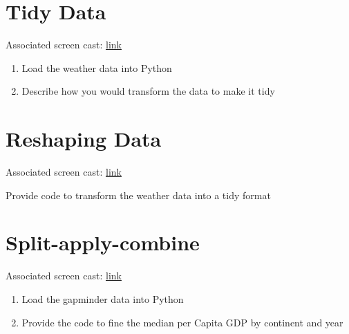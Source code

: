 \documentclass{article}
\begin{document}
\section{Tidy Data}
Associated screen cast: \href{https://www.youtube.com/watch?v=R4F6JjmXaN0&feature=youtu.be}{link}
\begin{enumerate}
		\item Load the weather data into Python
		\item Describe how you would transform the data to make it tidy
\end{enumerate}
\section{Reshaping Data}
Associated screen cast: \href{://www.youtube.com/watch?v=Ntlsv4D54nQ&feature=youtu.be}{link}

Provide code to transform the weather data into a tidy format

\section{Split-apply-combine}
Associated screen cast: \href{https://www.youtube.com/watch?v=jNe1NuY_jgM&feature=youtu.be}{link}
\begin{enumerate}
		\item Load the gapminder data into Python
		\item Provide the code to fine the median per Capita GDP by continent and year
\end{enumerate}
\end{document}
